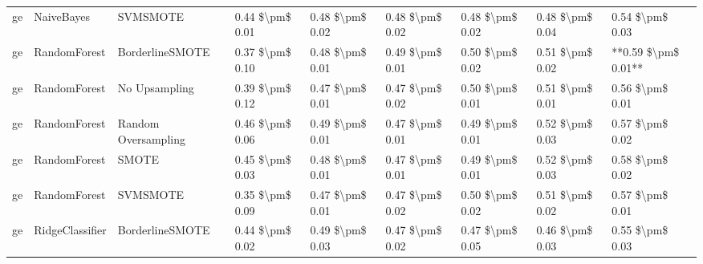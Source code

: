 \begin{tabular}{lllllllll}
      ge &                      NaiveBayes &                      SVMSMOTE & 0.44 \$\textbackslash pm\$ 0.01 &           0.48 \$\textbackslash pm\$ 0.02 &       0.48 \$\textbackslash pm\$ 0.02 &        0.48 \$\textbackslash pm\$ 0.02 &                         0.48 \$\textbackslash pm\$ 0.04 &     0.54 \$\textbackslash pm\$ 0.03 \\
      ge &                    RandomForest &               BorderlineSMOTE & 0.37 \$\textbackslash pm\$ 0.10 &           0.48 \$\textbackslash pm\$ 0.01 &       0.49 \$\textbackslash pm\$ 0.01 &        0.50 \$\textbackslash pm\$ 0.02 &                         0.51 \$\textbackslash pm\$ 0.02 & **0.59 \$\textbackslash pm\$ 0.01** \\
      ge &                    RandomForest &                 No Upsampling & 0.39 \$\textbackslash pm\$ 0.12 &           0.47 \$\textbackslash pm\$ 0.01 &       0.47 \$\textbackslash pm\$ 0.02 &        0.50 \$\textbackslash pm\$ 0.01 &                         0.51 \$\textbackslash pm\$ 0.01 &     0.56 \$\textbackslash pm\$ 0.01 \\
      ge &                    RandomForest &           Random Oversampling & 0.46 \$\textbackslash pm\$ 0.06 &           0.49 \$\textbackslash pm\$ 0.01 &       0.47 \$\textbackslash pm\$ 0.01 &        0.49 \$\textbackslash pm\$ 0.01 &                         0.52 \$\textbackslash pm\$ 0.03 &     0.57 \$\textbackslash pm\$ 0.02 \\
      ge &                    RandomForest &                         SMOTE & 0.45 \$\textbackslash pm\$ 0.03 &           0.48 \$\textbackslash pm\$ 0.01 &       0.47 \$\textbackslash pm\$ 0.01 &        0.49 \$\textbackslash pm\$ 0.01 &                         0.52 \$\textbackslash pm\$ 0.03 &     0.58 \$\textbackslash pm\$ 0.02 \\
      ge &                    RandomForest &                      SVMSMOTE & 0.35 \$\textbackslash pm\$ 0.09 &           0.47 \$\textbackslash pm\$ 0.01 &       0.47 \$\textbackslash pm\$ 0.02 &        0.50 \$\textbackslash pm\$ 0.02 &                         0.51 \$\textbackslash pm\$ 0.02 &     0.57 \$\textbackslash pm\$ 0.01 \\
      ge &                 RidgeClassifier &               BorderlineSMOTE & 0.44 \$\textbackslash pm\$ 0.02 &           0.49 \$\textbackslash pm\$ 0.03 &       0.47 \$\textbackslash pm\$ 0.02 &        0.47 \$\textbackslash pm\$ 0.05 &                         0.46 \$\textbackslash pm\$ 0.03 &     0.55 \$\textbackslash pm\$ 0.03 \\

\end{tabular}
